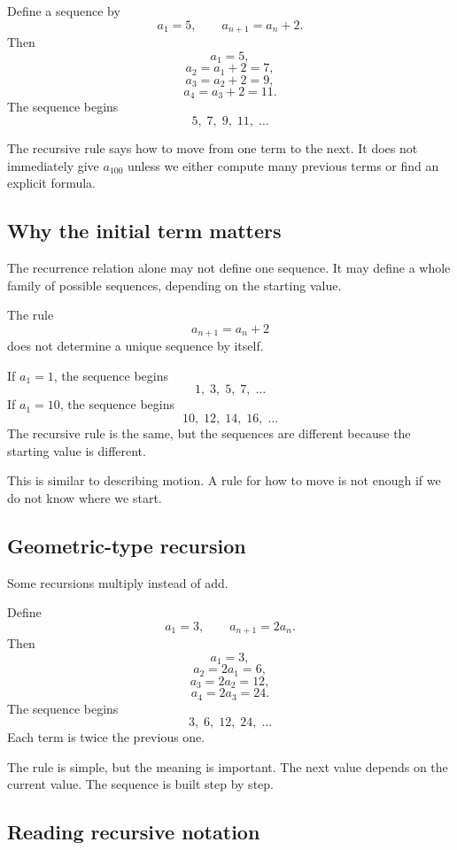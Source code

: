 \begin{examplebox}
Define a sequence by
\[
a_1=5,
\qquad
a_{n+1}=a_n+2.
\]
Then
\[
a_1=5,
\]
\[
a_2=a_1+2=7,
\]
\[
a_3=a_2+2=9,
\]
\[
a_4=a_3+2=11.
\]
The sequence begins
\[
5,\;7,\;9,\;11,\;\ldots
\]
\end{examplebox}

The recursive rule says how to move from one term to the next. It does not immediately give \(a_{100}\) unless we either compute many previous terms or find an explicit formula.

\subsection*{Why the initial term matters}

The recurrence relation alone may not define one sequence. It may define a whole family of possible sequences, depending on the starting value.

\begin{examplebox}
The rule
\[
a_{n+1}=a_n+2
\]
does not determine a unique sequence by itself.

If \(a_1=1\), the sequence begins
\[
1,\;3,\;5,\;7,\;\ldots
\]
If \(a_1=10\), the sequence begins
\[
10,\;12,\;14,\;16,\;\ldots
\]
The recursive rule is the same, but the sequences are different because the starting value is different.
\end{examplebox}

This is similar to describing motion. A rule for how to move is not enough if we do not know where we start.

\subsection*{Geometric-type recursion}

Some recursions multiply instead of add.

\begin{examplebox}
Define
\[
a_1=3,
\qquad
a_{n+1}=2a_n.
\]
Then
\[
a_1=3,
\]
\[
a_2=2a_1=6,
\]
\[
a_3=2a_2=12,
\]
\[
a_4=2a_3=24.
\]
The sequence begins
\[
3,\;6,\;12,\;24,\;\ldots
\]
Each term is twice the previous one.
\end{examplebox}

The rule is simple, but the meaning is important. The next value depends on the current value. The sequence is built step by step.

\subsection*{Reading recursive notation}

